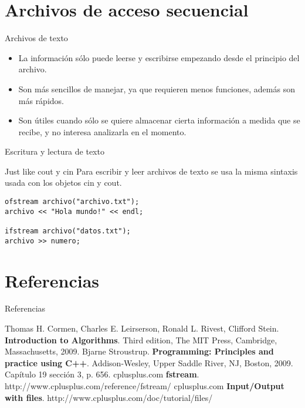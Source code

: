 \documentclass[aspectratio=169]{beamer}
\begin{document}
\section{Archivos de acceso secuencial}
\begin{frame}{Archivos de texto}
\begin{itemize}
\item La información sólo puede leerse y escribirse empezando desde el principio del archivo.
\item Son más sencillos de manejar, ya que requieren menos funciones, además son más rápidos.
\item Son útiles cuando sólo se quiere almacenar cierta información a medida que se recibe, y no interesa analizarla en el momento.
\end{itemize}
\end{frame}

\begin{frame}[fragile]{Escritura y lectura de texto}
\begin{block}{Just like cout y cin}
Para escribir y leer archivos de texto se usa la misma sintaxis usada con
los objetos cin y cout.
\end{block}
\begin{lstlisting}
ofstream archivo("archivo.txt");
archivo << "Hola mundo!" << endl;

ifstream archivo("datos.txt");
archivo >> numero;
\end{lstlisting}
\end{frame}

\section{Referencias}
\begin{frame}{Referencias}
\begin{thebibliography}{9}
Thomas H. Cormen, Charles E. Leirserson, Ronald L. Rivest, Clifford Stein.
\textbf{Introduction to Algorithms}.
Third edition, The MIT Press, Cambridge, Massachusetts, 2009.
Bjarne Stroustrup.
\textbf{Programming: Principles and practice using C++}.
Addison-Wesley, Upper Saddle River, NJ, Boston, 2009. Capítulo 19 sección 3, p. 656.
cplusplus.com
\textbf{fstream}. http://www.cplusplus.com/reference/fstream/
cplusplus.com
\textbf{Input/Output with files}. http://www.cplusplus.com/doc/tutorial/files/
\end{thebibliography}
\end{frame}
\end{document}
